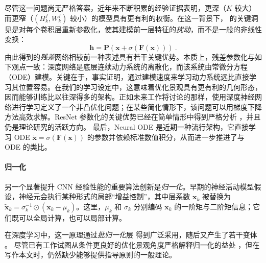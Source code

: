 尽管这一问题尚无严格答案，近年来不断积累的经验证据表明，更深（$K$ 较大）而更窄（$(H^f_k, W^f_k)$ 较小）的模型具有更有利的权衡。在这一背景下，\cite{he2016deep} 的关键洞见是对每个卷积层重新参数化，使其建模前一层特征的\emph{扰动}，而不是一般的非线性变换：
\begin{equation}
    \mathbf{h} = \mathbf{P}\left(\mathbf{x} + \sigma(\mathbf{F}(\mathbf{x})) \right)~.
\end{equation}
由此得到的\emph{残差}网络相较前一种表述具有若干关键优势。本质上，残差参数化与如下观点一致：深度网络是底层连续动力系统的离散化，而该系统由常微分方程（ODE）建模。关键在于，事实证明，通过建模速度来学习动力系统远比直接学习其位置容易。在我们的学习设定中，这意味着优化景观具有更有利的几何形态，因而能够训练比以往深得多的架构。正如未来工作将讨论的那样，使用深度神经网络进行学习定义了一个非凸优化问题；在某些简化情形下，该问题可以用梯度下降方法高效求解。ResNet 参数化的关键优势已经在简单情形中得到严格分析 \citep{hardt2016identity}，并且仍是理论研究的活跃方向。
最后，Neural ODE \citep{chen2018neural} 是近期一种流行架构，它直接学习 ODE $\dot{\mathbf{x}} = \sigma( \mathbf{F}(\mathbf{x}))$ 的参数并依赖标准数值积分，从而进一步推进了与 ODE 的类比。


\paragraph{归一化}
另一个显著提升 CNN 经验性能的重要算法创新是\emph{归一化}。早期的神经活动模型假设，神经元会执行某种形式的局部“增益控制”，其中层系数 $\mathbf{x}_{k}$ 被替换为 $\mathbf{\tilde{x}}_{k} = \sigma_k^{-1} \odot (\mathbf{x}_{k} - \mu_k)$。这里，$\mu_k$ 和 $\sigma_k$ 分别编码 $\mathbf{x}_k$ 的一阶矩与二阶矩信息；它们既可以全局计算，也可以局部计算。

在深度学习中，这一原理通过\emph{批归一化}层 \citep{ioffe2015batch} 得到广泛采用，随后又产生了若干变体 \citep{ba2016layer,salimans2016weight,ulyanov2016instance,cooijmans2016recurrent,wu2018group}。
尽管已有工作试图从条件更良好的优化景观角度严格解释归一化的益处 \citep{santurkar2018does}，但在写作本文时，仍然缺少能够提供指导原则的一般理论。

